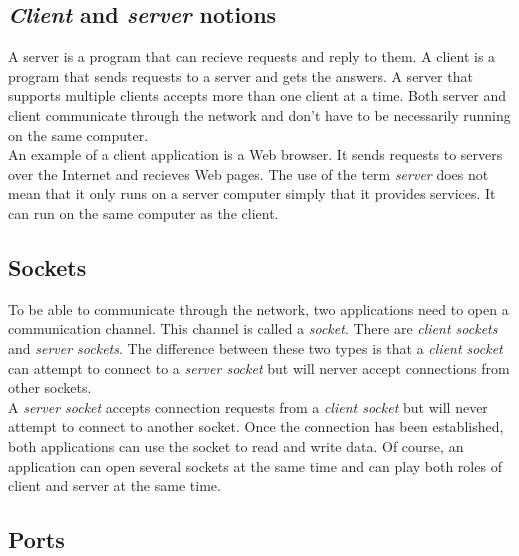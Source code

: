 \subsection{\textit{Client} and \textit{server} notions}

A server is a program that can recieve requests and reply to them. A client is
a program that sends requests to a server and gets the answers. A server
that supports multiple clients accepts more than one client at a time.
Both server and client communicate through the network and don't have to be 
necessarily running on the same computer.\\

An example of a client application is a Web browser. It sends requests to
servers over the Internet and recieves Web pages. The use of the term
\textit{server} does not mean that it only runs on a server computer simply that
it provides services. It can run on the same
computer as the client.


\subsection{Sockets}

To be able to communicate through the network, two applications need to open a
communication channel. This channel is called a \textit{socket}. There are
\textit{client sockets} and \textit{server sockets}. The difference between
these two types is that a \textit{client socket} can attempt to connect to a
\textit{server socket} but will nerver accept connections from other sockets.\\

A \textit{server socket} accepts connection requests from a \textit{client
socket} but will never attempt to connect to another socket. Once the connection
has been established, both applications can use the socket to read and write
data. Of course, an application can open several sockets at the same time and
can play both roles of client and server at the same time.\\


\subsection{Ports}


